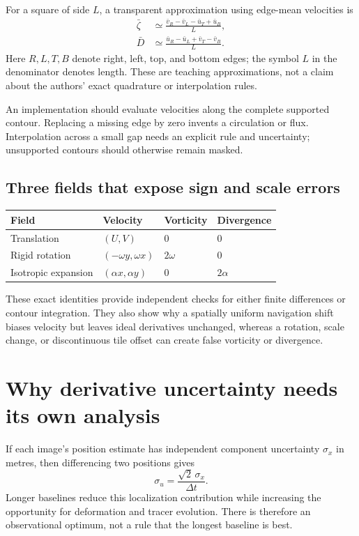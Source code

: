 \documentclass[11pt]{article}
\begin{document}
For a square of side $L$, a transparent approximation using edge-mean
velocities is
\begin{align}
 \bar\zeta&\simeq
 \frac{\bar v_R-\bar v_L-\bar u_T+\bar u_B}{L},\\
 \bar D&\simeq
 \frac{\bar u_R-\bar u_L+\bar v_T-\bar v_B}{L}.
\end{align}
Here $R,L,T,B$ denote right, left, top, and bottom edges; the symbol $L$
in the denominator denotes length. These are teaching approximations, not
a claim about the authors' exact quadrature or interpolation rules.

An implementation should evaluate velocities along the complete supported
contour. Replacing a missing edge by zero invents a circulation or flux.
Interpolation across a small gap needs an explicit rule and uncertainty;
unsupported contours should otherwise remain masked.

\subsection{Three fields that expose sign and scale errors}

\begin{center}
\begin{tabular}{@{}llll@{}}
\toprule
Field & Velocity & Vorticity & Divergence \\
\midrule
Translation & $(U,V)$ & $0$ & $0$ \\
Rigid rotation & $(-\omega y,\omega x)$ & $2\omega$ & $0$ \\
Isotropic expansion & $(\alpha x,\alpha y)$ & $0$ & $2\alpha$ \\
\bottomrule
\end{tabular}
\end{center}

These exact identities provide independent checks for either finite
differences or contour integration. They also show why a spatially uniform
navigation shift biases velocity but leaves ideal derivatives unchanged,
whereas a rotation, scale change, or discontinuous tile offset can create
false vorticity or divergence.

\section{Why derivative uncertainty needs its own analysis}

If each image's position estimate has independent component uncertainty
$\sigma_x$ in metres, then differencing two positions gives
\begin{equation}
 \sigma_u=\frac{\sqrt{2}\,\sigma_x}{\Delta t}.
\end{equation}
Longer baselines reduce this localization contribution while increasing the
opportunity for deformation and tracer evolution. There is therefore an
observational optimum, not a rule that the longest baseline is best.
\end{document}
